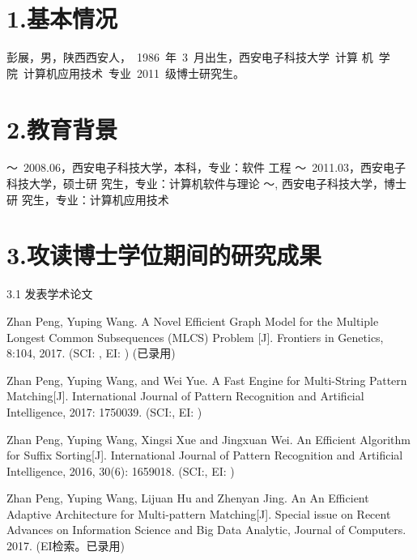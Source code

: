 
\begin{resume}

\section*{1.\hspace{0.75em}基本情况}
彭展，男，陕西西安人，~1986~年~3~月出生，西安电子科技大学~计算
机~学院~计算机应用技术~专业~2011~级博士研究生。
\section*{2.\hspace{0.75em}教育背景}
\begin{resumelist*}
  ～~2008.06，西安电子科技大学，本科，专业：软件
  工程
  ～~2011.03，西安电子科技大学，硕士研
  究生，专业：计算机软件与理论
  ～\hspace{3.5em}, 西安电子科技大学，博士研
  究生，专业：计算机应用技术
\end{resumelist*}

\section*{3.\hspace{0.75em}攻读博士学位期间的研究成果}
\begin{resumelist}{\hspace{-0.25em}3.1\hspace{0.5em} 发表学术论文}

  \resumelistitem Zhan Peng, Yuping Wang. A Novel Efficient Graph
  Model for the Multiple Longest Common Subsequences (MLCS) Problem
  [J]. Frontiers in Genetics, 8:104, 2017. (SCI: , EI: ) (已录用)

  \resumelistitem Zhan Peng, Yuping Wang, and Wei Yue. A Fast Engine
  for Multi-String Pattern Matching[J]. International Journal of Pattern
  Recognition and Artificial Intelligence, 2017: 1750039. (SCI:, EI: )

  \resumelistitem Zhan Peng, Yuping Wang, Xingsi Xue and Jingxuan
  Wei. An Efficient Algorithm for Suffix Sorting[J]. International
  Journal of Pattern Recognition and Artificial Intelligence, 2016,
  30(6): 1659018. (SCI:, EI: )


  \resumelistitem Zhan Peng, Yuping Wang, Lijuan Hu and Zhenyan
  Jing. An An Efficient Adaptive Architecture for Multi-pattern
  Matching[J]. Special issue on Recent Advances on Information Science
  and Big Data Analytic, Journal of Computers. 2017. (EI检索。已录用)


\end{resumelist}
\end{resume}
